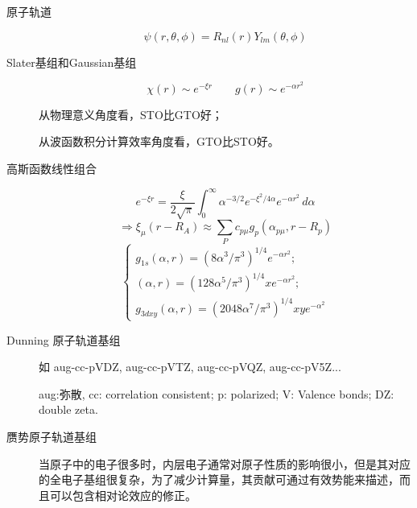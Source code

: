 \documentclass[12pt,a4paper,openany,twoside]{book}
\numberwithin{equation}{section}
\begin{document}
\begin{description}
          \item[原子轨道]
            \begin{equation}
              \psi(r,\theta,\phi)=R_{nl}(r)Y_{lm}(\theta,\phi)
            \end{equation}
        
          \item[Slater基组和Gaussian基组]
            \begin{equation}
              \chi(r)\sim e^{-\xi r} \qquad g(r)\sim e^{-\alpha r^2}
            \end{equation}
        
            从物理意义角度看，STO比GTO好；
          
            从波函数积分计算效率角度看，GTO比STO好。
        
          \item[高斯函数线性组合]
            \begin{equation}
              e^{-\xi r}=\frac{\xi}{2\sqrt{\pi}}\int_0^\infty \alpha^{-3/2} e^{-\xi^2/4\alpha}e^{-\alpha r^2} \, d\alpha
            \end{equation}
            \begin{equation}
              \Rightarrow \xi_\mu(r-R_A)\approx \sum_Pc_{p\mu}g_p(\alpha_{p\mu},r-R_p)
            \end{equation}
            \begin{equation}
              \begin{cases}
                g_{1s}(\alpha,r)=(8\alpha^3/\pi^3)^{1/4}e^{-\alpha r^2};\\
                (\alpha,r)=(128\alpha^5/\pi^3)^{1/4}xe^{-\alpha r^2};\\
                g_{3dxy}(\alpha,r)=(2048\alpha^7/\pi^3)^{1/4}xye^{-\alpha^2}
              \end{cases}
            \end{equation}

          \item[Dunning 原子轨道基组] 如 aug-cc-pVDZ, aug-cc-pVTZ, aug-cc-pVQZ, aug-cc-pV5Z...

            aug:弥散, cc: correlation consistent; p: polarized; V: Valence bonds; DZ: double zeta.
        
          \item[赝势原子轨道基组] 当原子中的电子很多时，内层电子通常对原子性质的影响很小，但是其对应的全电子基组很复杂，为了减少计算量，其贡献可通过有效势能来描述，而且可以包含相对论效应的修正。
        

\end{description}
\end{document}
